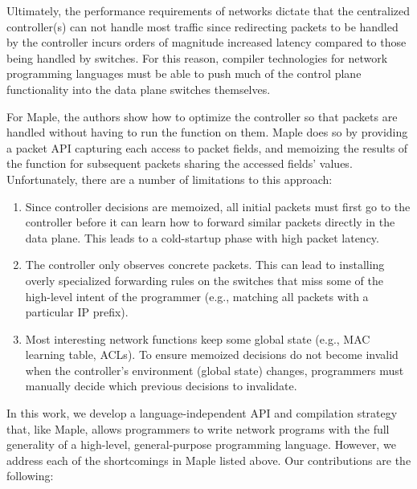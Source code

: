 \documentclass[preprint]{sigplanconf}
\begin{document}
Ultimately, the performance requirements of networks dictate that the centralized controller(s) can not handle most traffic since redirecting packets to be handled by the controller incurs orders of magnitude increased latency compared to those being handled by switches. For this reason, compiler technologies for network programming languages must be able to push much of the control plane functionality into the data plane switches themselves. 

For Maple, the authors show how to optimize the controller so that packets are handled without having to run the function on them. Maple does so by providing a packet API capturing each access to packet fields, and memoizing the results of the function for subsequent packets sharing the accessed fields' values. Unfortunately, there are a number of limitations to this approach:


\begin{enumerate}
\item Since controller decisions are memoized, all initial packets must first go to the controller before it can learn how to forward similar packets directly in the data plane. This leads to a cold-startup phase with high packet latency.
\item The controller only observes concrete packets. This can lead to installing overly specialized forwarding rules on the switches that miss some of the high-level intent of the programmer (e.g., matching all packets with a particular IP prefix).
\item Most interesting network functions keep some global state (e.g., MAC learning table, ACLs). To ensure memoized decisions do not become invalid when the controller's environment (global state) changes, programmers must manually decide which previous decisions to invalidate.
\end{enumerate}


In this work, we develop a language-independent API and compilation strategy that, like Maple, allows programmers to write network programs with the full generality of a high-level, general-purpose programming language.
However, we address each of the shortcomings in Maple listed above. Our contributions are the following:
\end{document}
